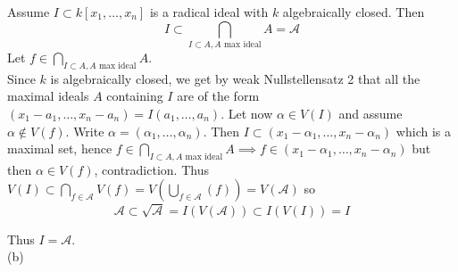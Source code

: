 \documentclass[a4paper]{article}
\begin{document}
    Assume $I \subset k\left[ x_1, \ldots, x_n \right] $ is a radical
    ideal with $k$ algebraically closed. Then
     \[
         I \subset \bigcap_{I \subset A, A \text{ max ideal}} A = \mathcal{A}
     \] 
     Let $f \in  \bigcap_{I \subset A, A \text{ max ideal}} A$.\\
     Since $k$ is algebraically closed, we get by weak Nullstellensatz 2 that
     all the maximal ideals $A$ containing $I$ are of the form
     $\left( x_1 - a_1, \ldots, x_n - a_n \right) = I \left( a_1, \ldots, a_n
     \right)  $.
     Let now $\alpha \in V(I)$ and assume $\alpha \not\in V(f)$. 
     Write $\alpha = \left( \alpha_1, \ldots, \alpha_n \right) $. Then
     $I \subset \left( x_1 -\alpha_1, \ldots, x_n - \alpha_n \right) $ which is
     a maximal set, hence
     $f \in \bigcap_{I \subset A, A \text{ max ideal}} A \implies f
     \in \left( x_1 - \alpha_1, \ldots, x_n - \alpha_n \right) $ but then
      $\alpha \in  V(f)$, contradiction. Thus
      $V(I) \subset \bigcap_{f \in \mathcal{A}} V(f)
      = V \left( \bigcup_{f \in \mathcal{A}} (f)  \right) 
      = V\left( \mathcal{A} \right) $ so 
       $$\mathcal{A} \subset \sqrt{\mathcal{A}} = I\left( V\left( \mathcal{A} \right)  \right) 
       \subset I \left( V\left( I \right)  \right) = I$$

       Thus $I = \mathcal{A}$.\\
       \linebreak
       (b)
       
\end{document}
